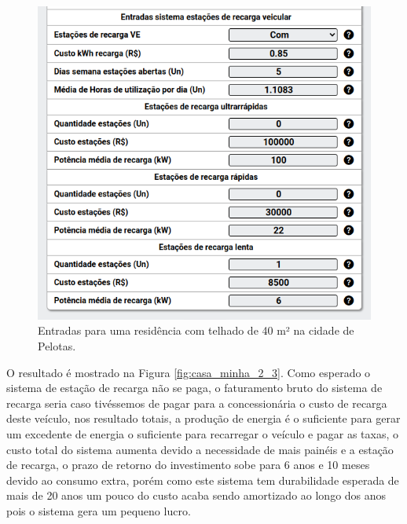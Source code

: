 \begin{figure}[H]
    \centering
    \includegraphics[width=1\textwidth]{./Figuras/casa_minha_2_3_2.png}
    \caption{Entradas para uma residência com telhado de 40 m² na cidade de Pelotas.}
   \label{fig:casa_minha_2_3_2}
\end{figure}

O resultado é mostrado na Figura \ref{fig:casa_minha_2_3}. Como esperado o sistema de estação de recarga não se paga, o faturamento bruto do sistema de recarga seria caso tivéssemos de pagar para a concessionária o custo de recarga deste veículo, nos resultado totais, a produção de energia é o suficiente para gerar um excedente de energia o suficiente para recarregar o veículo e pagar as taxas, o custo total do sistema aumenta devido a necessidade de mais painéis e a estação de recarga, o prazo de retorno do investimento sobe para 6 anos e 10 meses devido ao consumo extra, porém como este sistema tem durabilidade esperada de mais de 20 anos um pouco do custo acaba sendo amortizado ao longo dos anos pois o sistema gera um pequeno lucro.

